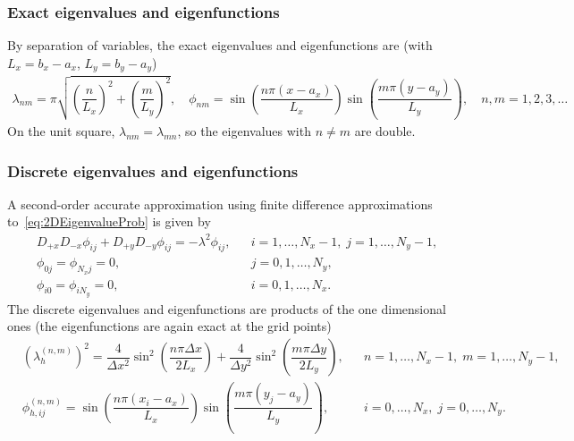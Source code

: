 \documentclass[11pt]{article}
\begin{document}
\subsubsection{Exact eigenvalues and eigenfunctions}
By separation of variables, the exact eigenvalues and eigenfunctions are (with $L_x=b_x-a_x$, $L_y=b_y-a_y$)
\begin{subequations}
\begin{align}
\lambda_{nm} = \pi\sqrt{\left(\dfrac{n}{L_x}\right)^2+\left(\dfrac{m}{L_y}\right)^2}, \quad \phi_{nm} = \sin\left( \dfrac{n\pi(x-a_x)}{L_x} \right)\sin\left( \dfrac{m\pi(y-a_y)}{L_y} \right), \quad n,m=1,2,3,\dots
\end{align}
\end{subequations}
On the unit square, $\lambda_{nm}=\lambda_{mn}$, so the eigenvalues with $n\neq m$ are double.
\subsubsection{Discrete eigenvalues and eigenfunctions}
A second-order accurate approximation using finite difference approximations to~\eqref{eq:2DEigenvalueProb} is given by
\begin{subequations}
\begin{align}
& D_{+x}D_{-x}\phi_{ij}+D_{+y}D_{-y}\phi_{ij} = -\lambda^2 \phi_{ij}, && i=1,\dots,N_x-1,\; j=1,\dots,N_y-1, \\
& \phi_{0j} = \phi_{N_x j} = 0, && j=0,1,\dots,N_y,\\
& \phi_{i0} = \phi_{i N_y} = 0, && i=0,1,\dots,N_x.
\end{align}
\end{subequations}
The discrete eigenvalues and eigenfunctions are products of the one dimensional ones (the eigenfunctions are again exact at the grid points)
\begin{subequations}
\begin{align}
& \left(\lambda^{(n,m)}_{h}\right)^2 =\dfrac{4}{\Delta x^2} \sin^2\left( \dfrac{n\pi \Delta x}{2L_x} \right)+\dfrac{4}{\Delta y^2} \sin^2\left( \dfrac{m\pi \Delta y}{2L_y} \right), && n=1,\dots,N_x-1,\; m=1,\dots,N_y-1,
\\
&\phi^{(n,m)}_{h,ij} = \sin\left( \dfrac{n\pi(x_i-a_x)}{L_x} \right)\sin\left( \dfrac{m\pi(y_j-a_y)}{L_y} \right), && i=0,\dots,N_x,\; j=0,\dots,N_y.
\end{align}
\end{subequations}
\end{document}
